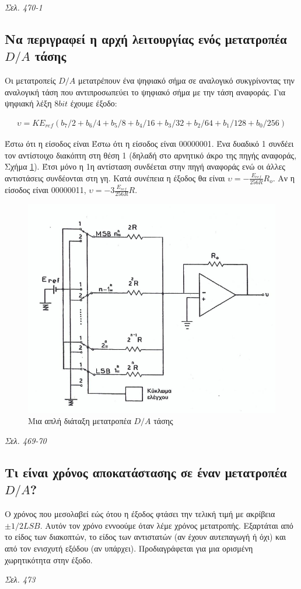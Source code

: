 \documentclass{article}
\begin{document}
\emph{Σελ. 470-1}

\subsection{Να περιγραφεί η αρχή λειτουργίας ενός μετατροπέα $D/A$ τάσης}
Οι μετατροπείς $D/A$ μετατρέπουν ένα ψηφιακό σήμα σε αναλογικό συκγρίνοντας την αναλογική τάση που αντιπροσωπεύει το ψηφιακό σήμα με την τάση αναφοράς. Για ψηφιακή λέξη $8bit$ έχουμε
έξοδο: 

\begin{align*}
    \upsilon = K E_{ref} \left( b_7/2 + b_6/4 + b_5/8 + b_4/16 +b_3/32 + b_2/64 + b_1/128 + b_0/256 \right)
\end{align*}

Έστω ότι η είσοδος είναι Έστω ότι η είσοδος είναι 00000001. Ένα δυαδικό 1 συνδέει τον αντίστοιχο διακόπτη στη θέση 1 (δηλαδή στο αρνητικό άκρο της πηγής αναφοράς, Σχήμα \ref{DAtashs}). Έτσι
μόνο η 1η αντίσταση συνδέεται στην πηγή αναφοράς ενώ οι άλλες αντιστάσεις συνδέονται στη γη. Κατά συνέπεια η έξοδος θα είναι $\upsilon = -\frac{E_{ref}}{256R}R_o$. Αν η είσοδος είναι
00000011, $\upsilon = -3\frac{E_{ref}}{256R}R$.

\begin{figure}
    \includegraphics[width=\linewidth]{DAtashs.png}
    \caption{Μια απλή διάταξη μετατροπέα $D/A$ τάσης}
    \label{DAtashs}
\end{figure}

\emph{Σελ. 469-70}

\subsection{Τι είναι χρόνος αποκατάστασης σε έναν μετατροπέα $D/A$?}
Ο χρόνος που μεσολαβεί εώς ότου η έξοδος φτάσει την τελική τιμή με ακρίβεια $\pm1/2LSB$. Aυτόν τον χρόνο εννοούμε όταν λέμε χρόνος μετατροπής. Εξαρτάται από το είδος
των διακοπτών, το είδος των αντιστατών (αν έχουν αυτεπαγωγή ή όχι) και από τον ενισχυτή εξόδου (αν υπάρχει). Προδιαγράφεται για μια ορισμένη χωρητικότητα στην έξοδο.

\emph{Σελ. 473}
\end{document}
